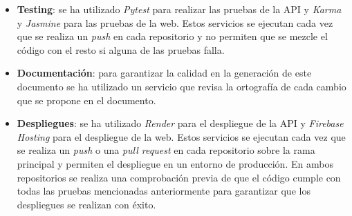 \begin{itemize}
    \newpage

    \item \textbf{Testing}: se ha utilizado \textit{Pytest} para realizar las pruebas de la API y \textit{Karma} y
    \textit{Jasmine} para las pruebas de la web. Estos servicios se ejecutan cada vez que se realiza un
    \textit{push} en cada repositorio y no permiten que se mezcle el código con el resto si alguna de las pruebas falla.
    \item \textbf{Documentación}: para garantizar la calidad en la generación de este documento se ha utilizado un
    servicio que revisa la ortografía de cada cambio que se propone en el documento.
    \item \textbf{Despliegues}: se ha utilizado \textit{Render} para el despliegue de la API y \textit{Firebase Hosting} para
    el despliegue de la web. Estos servicios se ejecutan cada vez que se realiza un \textit{push} o una \textit{pull request} en cada repositorio
    sobre la rama principal y permiten el despliegue en un entorno de producción. En ambos repositorios se realiza
    una comprobación previa de que el código cumple con todas las pruebas mencionadas anteriormente para garantizar
    que los despliegues se realizan con éxito.
\end{itemize}

